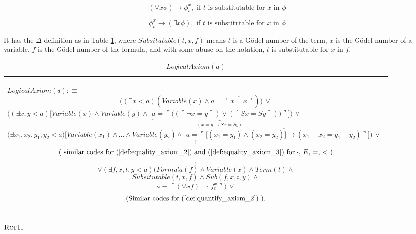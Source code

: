 \documentclass[11pt,letterpaper]{book}
\theoremstyle{definition}
\begin{document}
\begin{equation}
(\forall x \phi) \rightarrow \phi_t ^{x}, \text{ if } t \text{ is
substitutable for } x \text{ in } \phi \tag{Q1}
\end{equation}

\begin{equation}
\phi_t ^{x} \rightarrow (\exists x \phi), \text{ if } t \text{ is
substitutable for } x \text{ in } \phi \tag{Q2}
\end{equation}

It has the $\Delta$-definition as in Table \ref{table:logical_axiom}, where $Subsitutable(t, x, f)$ means $t$ is a G\"odel number of the term, $x$ is the G\"odel number of a variable, $f$ is the G\"odel number of the formula, and with some abuse on the notation, $t$ is substitutable for $x$ in $f$.


\begin{table}
\caption{$LogicalAxiom (a)$}
\label{table:logical_axiom}
\begin{tabular}{|p{0.9\linewidth}|}
\hline
\rule{0pt}{3ex}
\begin{center}
$LogicalAxiom  (a) : \equiv $
$$ \bigg( (\exists x < a) (Variable(x) \land a = \overline{\ulcorner  x = x \urcorner } ) \bigg) \, \lor $$
$ \bigg( (\exists x, y < a) \bigg[ Variable(x) \land Variable(y) \land $ $ \underbrace{ a = \overline{\ulcorner \big( ( \ulcorner \lnot x =  y \urcorner ) \lor ( \ulcorner S x = S y \urcorner ) \big) \urcorner} }_{ (x = y \rightarrow S x = S y) } \bigg] \bigg) \, \lor$
$ \bigg( \exists x_1, x_2, y_1, y_2 < a) \bigg[ Variable(x_1) \land \ldots \land Variable(y_2) \land$ $ a = \overline{ \ulcorner \big[ (x_1 = y_1) \land (x_2 = y_2) \big] \rightarrow (x_1 + x_2 = y_1 + y_2) \urcorner } \bigg] \bigg)\, \lor $
$$ \vdots $$
$$ \text{( similar codes for (\ref{def:equality_axiom_2}) and (\ref{def:equality_axiom_3}) for $\cdot$, $E$, $=$, $<$ )} $$
$$ \vdots $$   
$$ \lor (\exists f, x, t , y < a) \bigg( Formula(f) \land Variable(x) \land Term(t) \land $$
$$ Subsitutable(t, x, f) \land Sub(f, x , t, y) \land $$ 
$$ a = \overline{\ulcorner (\forall x f) \rightarrow f_t ^x \urcorner} \bigg) \, \lor $$
$$ \text{(Similar codes for (\ref{def:quantify_axiom_2}) )} .$$
\end{center}\\
\hline
\end{tabular}
\end{table}


\paragraph{$\text{\textsc{RofI}}$.}
\end{document}
